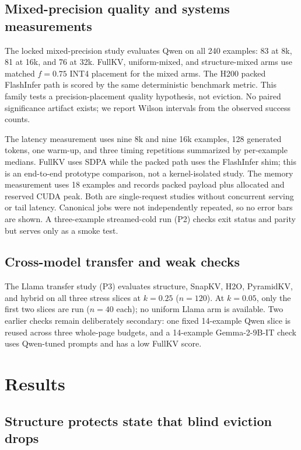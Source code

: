 \documentclass[10pt]{article}
\begin{document}
\subsection{Mixed-precision quality and systems measurements}
\label{sec:int4-design}
\label{sec:systems-design}

The locked mixed-precision study evaluates Qwen on all 240 examples: 83 at 8k,
81 at 16k, and 76 at 32k.  FullKV, uniform-mixed, and structure-mixed arms use
matched $f=0.75$ INT4 placement for the mixed arms.  The H200 packed FlashInfer
path is scored by the same deterministic benchmark metric.  This family tests a
precision-placement quality hypothesis, not eviction.  No paired significance
artifact exists; we report Wilson intervals from the observed success counts.

The latency measurement uses nine 8k and nine 16k examples, 128 generated
tokens, one warm-up, and three timing repetitions summarized by per-example
medians.  FullKV uses SDPA while the packed path uses the FlashInfer shim; this
is an end-to-end prototype comparison, not a kernel-isolated study.  The memory
measurement uses 18 examples and records packed payload plus allocated and
reserved CUDA peak.  Both are single-request studies without concurrent serving
or tail latency.  Canonical jobs were not independently repeated, so no error
bars are shown.  A three-example streamed-cold run (P2) checks exit status and
parity but serves only as a smoke test.

\subsection{Cross-model transfer and weak checks}
\label{sec:p3-design}
\label{sec:legacy-design}

The Llama transfer study (P3) evaluates structure, SnapKV, H2O, PyramidKV, and
hybrid on all three stress slices at $k=0.25$ ($n=120$).  At $k=0.05$, only the
first two slices are run ($n=40$ each); no uniform Llama arm is available.  Two
earlier checks remain deliberately secondary: one fixed 14-example Qwen slice
is reused across three whole-page budgets, and a 14-example Gemma-2-9B-IT check
uses Qwen-tuned prompts and has a low FullKV score.

\section{Results}
\label{sec:results}

\subsection{Structure protects state that blind eviction drops}
\label{sec:p0-results}
\end{document}
